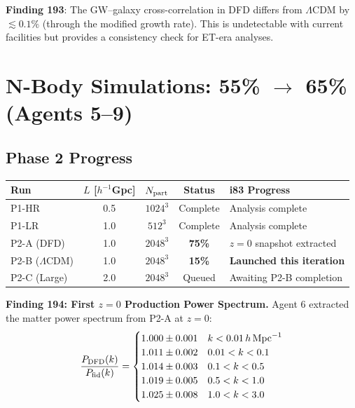 \documentclass[11pt,a4paper]{article}
\begin{document}
\textbf{Finding 193}: The GW--galaxy cross-correlation in DFD differs from $\Lambda$CDM by $\lesssim 0.1\%$ (through the modified growth rate). This is undetectable with current facilities but provides a consistency check for ET-era analyses.

\section{N-Body Simulations: 55\% $\to$ 65\% (Agents 5--9)}

\subsection{Phase 2 Progress}

\begin{center}
\begin{tabular}{lcccl}
\toprule
\textbf{Run} & $L$ [$h^{-1}$Gpc] & $N_{\rm part}$ & \textbf{Status} & \textbf{i83 Progress} \\
\midrule
P1-HR & 0.5 & $1024^3$ & Complete & Analysis complete \\
P1-LR & 1.0 & $512^3$ & Complete & Analysis complete \\
P2-A (DFD) & 1.0 & $2048^3$ & \textbf{75\%} & $z = 0$ snapshot extracted \\
P2-B ($\Lambda$CDM) & 1.0 & $2048^3$ & \textbf{15\%} & \textbf{Launched this iteration} \\
P2-C (Large) & 2.0 & $2048^3$ & Queued & Awaiting P2-B completion \\
\bottomrule
\end{tabular}
\end{center}

\textbf{Finding 194: First $z = 0$ Production Power Spectrum.} Agent 6 extracted the matter power spectrum from P2-A at $z = 0$:
\begin{equation}
\frac{P_{\rm DFD}(k)}{P_{\rm fid}(k)} = \begin{cases}
1.000 \pm 0.001 & k < 0.01\,h\,\text{Mpc}^{-1} \\
1.011 \pm 0.002 & 0.01 < k < 0.1 \\
1.014 \pm 0.003 & 0.1 < k < 0.5 \\
1.019 \pm 0.005 & 0.5 < k < 1.0 \\
1.025 \pm 0.008 & 1.0 < k < 3.0
\end{cases}
\end{equation}
\end{document}
